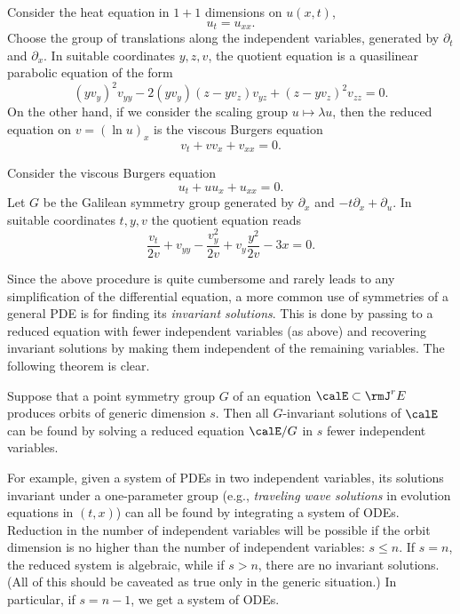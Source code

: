 \begin{example}
    Consider the heat equation in $1+1$ dimensions on $u(x,t)$,
    \[u_t=u_{xx}.\]
    Choose the group of translations along the independent variables, generated by $\partial_t$ and $\partial_x$. In suitable coordinates $y,z,v$, the quotient equation is a quasilinear parabolic equation of the form 
    \[(yv_y)^2v_{yy}-2(yv_y)(z-yv_z)v_{yz}+(z-yv_z)^2v_{zz}=0.\]
    On the other hand, if we consider the scaling group $u\mapsto \lambda u$, then the reduced equation on $v=(\ln u)_x$ is the viscous Burgers equation
    \[v_t+vv_x+v_{xx}=0.\]
\end{example}
\begin{example}
    Consider the viscous Burgers equation 
    \[u_t+uu_x+u_{xx}=0.\]
    Let $G$ be the Galilean symmetry group generated by $\partial_x$ and $-t\partial_x+\partial_u$. In suitable coordinates $t,y,v$ the quotient equation reads 
    \[\frac{v_t}{2v}+v_{yy}-\frac{v_y^2}{2v}+v_y\frac{y^2}{2v}-3x=0.\]
\end{example}

Since the above procedure is quite cumbersome and rarely leads to any simplification of the differential equation, a more common use of symmetries of a general PDE is for finding its \emph{invariant solutions}. This is done by passing to a reduced equation with fewer independent variables (as above) and recovering invariant solutions by making them independent of the remaining variables. The following theorem is clear.

\begin{thm}
    Suppose that a point symmetry group $G$ of an equation $\calE\subset\rmJ^r E$ produces orbits of generic dimension $s$. Then all $G$-invariant solutions of $\calE$ can be found by solving a reduced equation $\calE\slash G$ in $s$ fewer independent variables.
\end{thm}

For example, given a system of PDEs in two independent variables, its solutions invariant under a one-parameter group (e.g., \emph{traveling wave solutions} in evolution equations in $(t,x)$) can all be found by integrating a system of ODEs. Reduction in the number of independent variables will be possible if the orbit dimension is no higher than the number of independent variables: $s\leq n$. If $s=n$, the reduced system is algebraic, while if $s>n$, there are no invariant solutions. (All of this should be caveated as true only in the generic situation.) In particular, if $s=n-1$, we get a system of ODEs.

